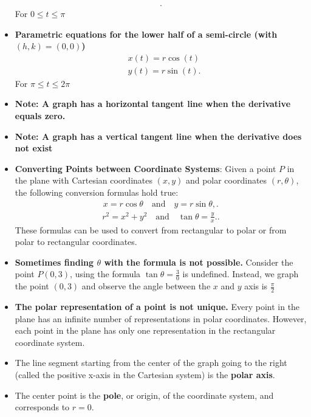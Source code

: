 \documentclass{report}
\begin{document}
\begin{itemize}
\begin{align*}
            .\end{align*}
            For $0 \leq t \leq \pi $
        \item \textbf{Parametric equations for the lower half of a semi-circle (with $(h,k) = (0,0)$)}
            \begin{align*}
                &x(t) = r\cos{(t)} \\
                &y(t) = r\sin{(t)}
            .\end{align*}
            For $\pi \leq t \leq 2\pi $
        \item \textbf{Note: A graph has a horizontal tangent line when the derivative equals zero.}
        \item \textbf{Note: A graph has a vertical tangent line when the derivative does not exist}
        \item \textbf{Converting Points between Coordinate Systems}: 
            Given a point \( P \) in the plane with Cartesian coordinates \((x, y)\) and polar coordinates \((r, \theta)\), the following conversion formulas hold true:
            \begin{align*}
                x = r \cos \theta \quad \text{and} \quad y = r \sin \theta,
            .\end{align*}
            \begin{align*}
                r^2 = x^2 + y^2 \quad \text{and} \quad \tan \theta = \frac{y}{x}.
            .\end{align*}
            These formulas can be used to convert from rectangular to polar or from polar to rectangular coordinates.
        \item \textbf{Sometimes finding $\theta$ with the formula is not possible.} Consider the point $P(0,3)$, using the formula $\tan{\theta } = \frac{3}{0}$ is undefined. Instead, we graph the point $(0,3)$ and observe the angle between the $x$ and $y$ axis is $\frac{\pi}{2}$ 
        \item \textbf{The polar representation of a point is not unique.} Every point in the plane has an infinite number of representations in polar coordinates. However, each point in the plane has only one representation in the rectangular coordinate system.
        \item The line segment starting from the center of the graph going to the right (called the positive x-axis in the Cartesian system) is the \textbf{polar axis}. 
        \item The center point is the \textbf{pole}, or origin, of the coordinate system, and corresponds to  $r=0$.

\end{itemize}
\end{document}
